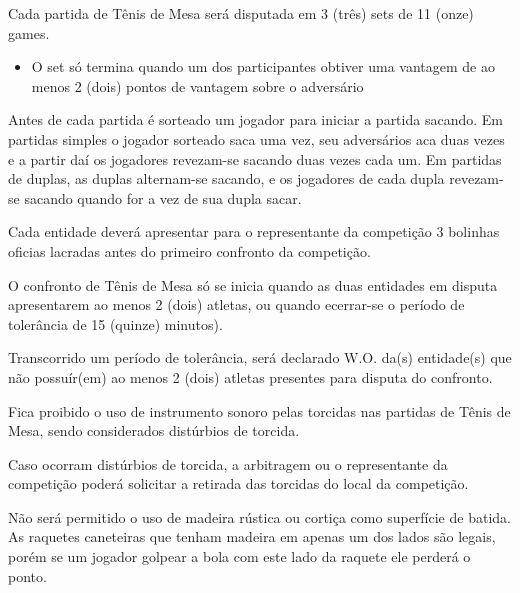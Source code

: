 \noindent
Cada partida de Tênis de Mesa será disputada em 3 (três) sets de 11 (onze) games.
\begin{itemize}[noitemsep]
	\item O set só termina quando um dos participantes obtiver uma vantagem de ao menos 2 (dois) pontos de vantagem sobre o adversário
\end{itemize}

\noindent
Antes de cada partida é sorteado um jogador para iniciar a partida sacando. Em partidas simples o jogador sorteado saca uma vez, seu adversários aca duas vezes e a partir daí os jogadores revezam-se sacando duas vezes cada um. Em partidas de duplas, as duplas alternam-se sacando, e os jogadores de cada dupla revezam-se sacando quando for a vez de sua dupla sacar.

\begin{article}
	Cada entidade deverá apresentar para o representante da competição 3 bolinhas oficias lacradas antes do primeiro confronto da competição.
\end{article}

\begin{article}
	O confronto de Tênis de Mesa só se inicia quando as duas entidades em disputa apresentarem ao menos 2 (dois) atletas, ou quando ecerrar-se o período de tolerância de 15 (quinze) minutos).

	\begin{xparagraph}
		Transcorrido um período de tolerância, será declarado W.O. da(s) entidade(s) que não possuír(em) ao menos 2 (dois) atletas presentes para disputa do confronto.
	\end{xparagraph}
\end{article}

\begin{article}
	Fica proibido o uso de instrumento sonoro pelas torcidas nas partidas de Tênis de Mesa, sendo considerados distúrbios de torcida.

	\begin{xparagraph}
		Caso ocorram distúrbios de torcida, a arbitragem ou o representante da competição poderá solicitar a retirada das torcidas do local da competição.
	\end{xparagraph}
\end{article}

\begin{article}
	Não será permitido o uso de madeira rústica ou cortiça como superfície de batida. As raquetes caneteiras que tenham madeira em apenas um dos lados são legais, porém se um jogador golpear a bola com este lado da raquete ele perderá o ponto.
\end{article}
